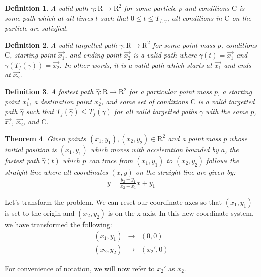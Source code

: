 \documentclass[12pt]{amsart}   %
\newtheorem{theorem}{Theorem}[section]
\newtheorem{definition}[theorem]{Definition}
\begin{document}
\begin{definition}
  A valid path $\gamma: \mathrm{R} \to \mathrm{R}^2$ for some particle $p$ and conditions $\mathrm{C}$ is some path which at all times $t$ such that $0 \leq t \leq T_{f, \gamma}$, all conditions in $\mathrm{C}$ on the particle are satisfied.
\end{definition}

\begin{definition}
  A valid targetted path $\gamma: \mathrm{R} \to \mathrm{R}^2$ for some point mass $p$, conditions $\mathrm{C}$, starting point $\vec{x_1}$, and ending point $\vec{x_2}$ is a valid path where $\gamma(t) = \vec{x_1}$ and $\gamma(T_f(\gamma)) = \vec{x_2}$. In other words, it is a valid path which starts at $\vec{x_1}$ and ends at $\vec{x_2}$.
\end{definition}

\begin{definition}
  A fastest path $\hat{\gamma}: \mathrm{R} \to \mathrm{R}^2$ for a particular point mass $p$, a starting point $\vec{x_1}$, a destination point $\vec{x_2}$, and some set of conditions $\mathrm{C}$ is a valid targetted path $\hat{\gamma}$ such that $T_f(\hat{\gamma}) \leq T_f(\gamma)$ for all valid targetted paths $\gamma$ with the same $p$, $\vec{x_1}$, $\vec{x_2}$, and $\mathrm{C}$.
\end{definition}

  \begin{theorem}
  Given points $(x_1, y_1), (x_2, y_2) \in \mathrm{R}^2$ and a point mass $p$ whose initial position is $(x_1, y_1)$ which moves with acceleration bounded by $\bar{a}$, the fastest path $\hat{\gamma}(t)$ which $p$ can trace from $(x_1, y_1)$ to $(x_2, y_2)$ follows the straight line where all coordinates $(x,y)$ on the straight line are given by:
  \begin{eqnarray}
    y = \frac{y_2 - y_1}{x_2 - x_1} x + y_1
  \end{eqnarray}
\end{theorem}
\proof Let's transform the problem. We can reset our coordinate axes so that $(x_1, y_1)$ is set to the origin and $(x_2, y_2)$ is on the x-axis. In this new coordinate system, we have transformed the following:
\begin{eqnarray}
  (x_1, y_1) &\to& (0,0) \\
  (x_2, y_2) &\to& (x_2', 0)
\end{eqnarray}

For convenience of notation, we will now refer to $x_2'$ as $x_2$.
\end{document}
